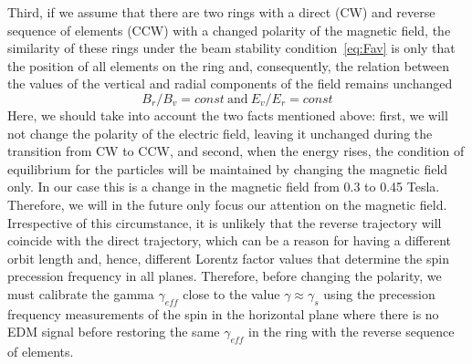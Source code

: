 \documentclass[a4paper]{jacow}
\begin{document}
Third, if we assume that there are two rings with a direct (CW) and reverse sequence of elements (CCW) with a changed polarity of the magnetic field, the similarity of these rings under the beam stability condition~\eqref{eq:Fav} is only that the position of all elements on the ring and, consequently, the relation between the values of the vertical and radial components of the field remains unchanged
\begin{equation}\label{eq:element position}
B_r/B_v=const\ \text {and}\ E_v/E_r=const
\end{equation}
Here, we should take into account the two facts mentioned above: first, we will not change the polarity of the electric field, leaving it unchanged during the transition from CW to CCW, and second, when the energy rises, the condition of equilibrium for the particles will be maintained by changing the magnetic field only. In our case this is a change in the magnetic field from 0.3 to 0.45 Tesla. Therefore, we will in the future only focus our attention on the magnetic field. Irrespective of this circumstance, it is unlikely that the reverse trajectory will coincide with the direct trajectory, which can be a reason for having a different orbit length and, hence, different Lorentz factor values   that determine the spin precession frequency in all planes. Therefore, before changing the polarity, we must calibrate the gamma $\gamma_{eff}$   close to the value $\gamma\approx\gamma_s$   using the precession frequency measurements of the spin in the horizontal plane where there is no EDM signal before restoring the same $\gamma_{eff}$   in the ring with the reverse sequence of elements.
\end{document}
